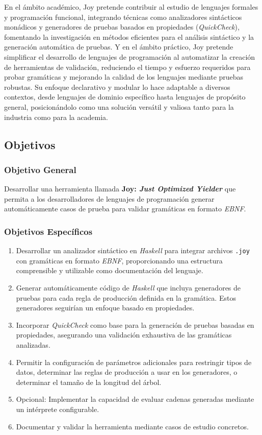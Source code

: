 \documentclass[11pt]{article}
\begin{document}
En el ámbito académico, Joy pretende contribuir al estudio de lenguajes formales y programación funcional, integrando técnicas como analizadores sintácticos monádicos y generadores de pruebas basados en propiedades (\textit{QuickCheck}), fomentando la investigación en métodos eficientes para el análisis sintáctico y la generación automática de pruebas. Y en el ámbito práctico, Joy pretende simplificar el desarrollo de lenguajes de programación al automatizar la creación de herramientas de validación, reduciendo el tiempo y esfuerzo requeridos para probar gramáticas y mejorando la calidad de los lenguajes mediante pruebas robustas. Su enfoque declarativo y modular lo hace adaptable a diversos contextos, desde lenguajes de dominio específico hasta lenguajes de propósito general, posicionándolo como una solución versátil y valiosa tanto para la industria como para la academia.

\subsection*{Objetivos}

\subsubsection*{Objetivo General}

Desarrollar una herramienta llamada \textbf{Joy: \textit{Just Optimized Yielder}} que permita a los desarrolladores de lenguajes de programación generar automáticamente casos de prueba para validar gramáticas en formato \textit{EBNF}.

\subsubsection*{Objetivos Específicos}

\begin{enumerate}
\item Desarrollar un analizador sintáctico en \textit{Haskell} para integrar archivos \texttt{.joy} con gramáticas en formato \textit{EBNF}, proporcionando una estructura comprensible y utilizable como documentación del lenguaje.
\item Generar automáticamente código de \textit{Haskell} que incluya generadores de pruebas para cada regla de producción definida en la gramática. Estos generadores seguirían un enfoque basado en propiedades.
\item Incorporar \textit{QuickCheck} como base para la generación de pruebas basadas en propiedades, asegurando una validación exhaustiva de las gramáticas analizadas.
\item Permitir la configuración de parámetros adicionales para restringir tipos de datos, determinar las reglas de producción a usar en los generadores, o determinar el tamaño de la longitud del árbol.
\item Opcional: Implementar la capacidad de evaluar cadenas generadas mediante un intérprete configurable.
\item Documentar y validar la herramienta mediante casos de estudio concretos.
\end{enumerate}
\end{document}
